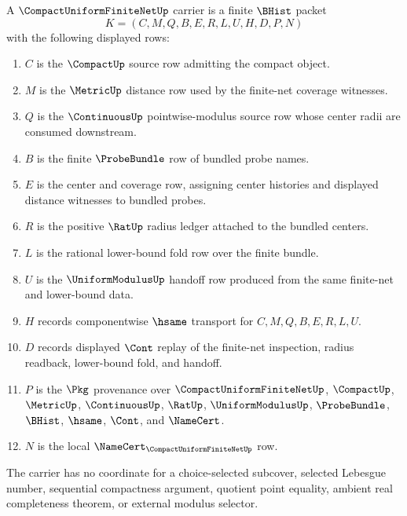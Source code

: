 \begin{definition}
\label{def:compact-uniform-finite-net-carrier}
A $\CompactUniformFiniteNetUp$ carrier is a finite $\BHist$ packet
$$
K=(C,M,Q,B,E,R,L,U,H,D,P,N)
$$
with the following displayed rows:
\begin{enumerate}
\item $C$ is the $\CompactUp$ source row admitting the compact object.
\item $M$ is the $\MetricUp$ distance row used by the finite-net coverage witnesses.
\item $Q$ is the $\ContinuousUp$ pointwise-modulus source row whose center radii are consumed downstream.
\item $B$ is the finite $\ProbeBundle$ row of bundled probe names.
\item $E$ is the center and coverage row, assigning center histories and displayed distance witnesses to bundled probes.
\item $R$ is the positive $\RatUp$ radius ledger attached to the bundled centers.
\item $L$ is the rational lower-bound fold row over the finite bundle.
\item $U$ is the $\UniformModulusUp$ handoff row produced from the same finite-net and lower-bound data.
\item $H$ records componentwise $\hsame$ transport for $C,M,Q,B,E,R,L,U$.
\item $D$ records displayed $\Cont$ replay of the finite-net inspection, radius readback, lower-bound fold, and handoff.
\item $P$ is the $\Pkg$ provenance over $\CompactUniformFiniteNetUp$, $\CompactUp$, $\MetricUp$, $\ContinuousUp$, $\RatUp$, $\UniformModulusUp$, $\ProbeBundle$, $\BHist$, $\hsame$, $\Cont$, and $\NameCert$.
\item $N$ is the local $\NameCert_{\CompactUniformFiniteNetUp}$ row.
\end{enumerate}
The carrier has no coordinate for a choice-selected subcover, selected Lebesgue number, sequential compactness argument, quotient point equality, ambient real completeness theorem, or external modulus selector.
\end{definition}


